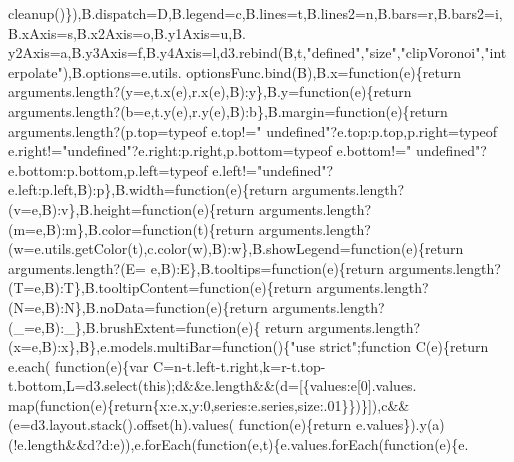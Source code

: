 \begin{DoxyCode}
{      cleanup()\}),B.dispatch=D,B.legend=c,B.lines=t,B.lines2=n,B.bars=r,B.bars2=i,B.xAxis=s,B.x2Axis=o,B.y1Axis=u,B.
      y2Axis=a,B.y3Axis=f,B.y4Axis=l,d3.rebind(B,t,\textcolor{stringliteral}{"defined"},\textcolor{stringliteral}{"size"},\textcolor{stringliteral}{"clipVoronoi"},\textcolor{stringliteral}{"interpolate"}),B.options=e.utils.
      optionsFunc.bind(B),B.x=\textcolor{keyword}{function}(e)\{\textcolor{keywordflow}{return} arguments.length?(y=e,t.x(e),r.x(e),B):y\},B.y=\textcolor{keyword}{function}(e)\{\textcolor{keywordflow}{return} 
      arguments.length?(b=e,t.y(e),r.y(e),B):b\},B.margin=\textcolor{keyword}{function}(e)\{\textcolor{keywordflow}{return} arguments.length?(p.top=typeof e.top!=\textcolor{stringliteral}{"
      undefined"}?e.top:p.top,p.right=typeof e.right!=\textcolor{stringliteral}{"undefined"}?e.right:p.right,p.bottom=typeof e.bottom!=\textcolor{stringliteral}{"
      undefined"}?e.bottom:p.bottom,p.left=typeof e.left!=\textcolor{stringliteral}{"undefined"}?e.left:p.left,B):p\},B.width=\textcolor{keyword}{function}(e)\{\textcolor{keywordflow}{return} 
      arguments.length?(v=e,B):v\},B.height=\textcolor{keyword}{function}(e)\{\textcolor{keywordflow}{return} arguments.length?(m=e,B):m\},B.color=\textcolor{keyword}{function}(t)\{\textcolor{keywordflow}{return} 
      arguments.length?(w=e.utils.getColor(t),c.color(w),B):w\},B.showLegend=\textcolor{keyword}{function}(e)\{\textcolor{keywordflow}{return} arguments.length?(E=
      e,B):E\},B.tooltips=\textcolor{keyword}{function}(e)\{\textcolor{keywordflow}{return} arguments.length?(T=e,B):T\},B.tooltipContent=\textcolor{keyword}{function}(e)\{\textcolor{keywordflow}{return} 
      arguments.length?(N=e,B):N\},B.noData=\textcolor{keyword}{function}(e)\{\textcolor{keywordflow}{return} arguments.length?(\_=e,B):\_\},B.brushExtent=\textcolor{keyword}{function}(e)\{\textcolor{keywordflow}{
      return} arguments.length?(x=e,B):x\},B\},e.models.multiBar=\textcolor{keyword}{function}()\{\textcolor{stringliteral}{"use strict"};\textcolor{keyword}{function} C(e)\{\textcolor{keywordflow}{return} e.each(\textcolor{keyword}{
      function}(e)\{var C=n-t.left-t.right,k=r-t.top-t.bottom,L=d3.select(\textcolor{keyword}{this});d&&e.length&&(d=[\{values:e[0].values.
      map(\textcolor{keyword}{function}(e)\{\textcolor{keywordflow}{return}\{x:e.x,y:0,series:e.series,size:.01\}\})\}]),c&&(e=d3.layout.stack().offset(h).values(\textcolor{keyword}{
      function}(e)\{\textcolor{keywordflow}{return} e.values\}).y(a)(!e.length&&d?d:e)),e.forEach(\textcolor{keyword}{function}(e,t)\{e.values.forEach(\textcolor{keyword}{function}(e)\{e.
}
\end{DoxyCode}
